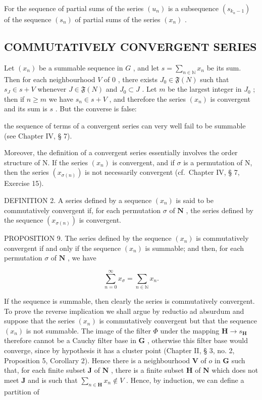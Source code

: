 For the sequence of partial sums of the series \((u_{n})\) is a subsequence \((s_{k_{n}-1})\) of the sequence \((s_{n})\) of partial sums of the series \((x_{n})\) .

\subsection{COMMUTATIVELY CONVERGENT SERIES}

Let \((x_{n})\) be a summable sequence in \(G\) , and let \(s = \sum_{n\in \mathbb{N}}x_n\) be its sum. Then for each neighbourhood \(V\) of \(0\) , there exists \(J_0\in \mathfrak{F}(N)\) such that \(s_J\in s + V\) whenever \(J\in \mathfrak{F}(N)\) and \(J_0\subset J\) . Let \(m\) be the largest integer in \(J_0\) ; then if \(n\geqslant m\) we have \(s_n\in s + V\) , and therefore the series \((x_{n})\) is convergent and its sum is \(s\) . But the converse is false:

the sequence of terms of a convergent series can very well fail to be summable (see Chapter IV, § 7).

Moreover, the definition of a convergent series essentially involves the order structure of N. If the series \((x_{n})\) is convergent, and if \(\sigma\) is a permutation of N, then the series \((x_{\sigma(n)})\) is not necessarily convergent (cf.~Chapter IV, § 7, Exercise 15).

DEFINITION 2. A series defined by a sequence \((x_{n})\) is said to be commutatively convergent if, for each permutation \(\sigma\) of \(\mathbf{N}\) , the series defined by the sequence \((x_{\sigma(n)})\) is convergent.

PROPOSITION 9. The series defined by the sequence \((x_{n})\) is commutatively convergent if and only if the sequence \((x_{n})\) is summable; and then, for each permutation \(\sigma\) of \(\mathbf{N}\) , we have

\[
\sum_ {n = 0} ^ {\infty} x _ {\sigma} = \sum_ {n \in \mathbb {N}} x _ {n}.
\]

If the sequence is summable, then clearly the series is commutatively convergent. To prove the reverse implication we shall argue by reductio ad absurdum and suppose that the series \((x_{n})\) is commutatively convergent but that the sequence \((x_{n})\) is not summable. The image of the filter \(\Phi\) under the mapping \(\mathbf{H} \to s_{\mathbf{H}}\) therefore cannot be a Cauchy filter base in \(\mathbf{G}\) , otherwise this filter base would converge, since by hypothesis it has a cluster point (Chapter II, § 3, no. 2, Proposition 5, Corollary 2). Hence there is a neighbourhood \(\mathbf{V}\) of \(o\) in \(\mathbf{G}\) such that, for each finite subset \(\mathbf{J}\) of \(\mathbf{N}\) , there is a finite subset \(\mathbf{H}\) of \(\mathbf{N}\) which does not meet \(\mathbf{J}\) and is such that \(\sum_{n \in \mathbf{H}} x_{n} \notin V\) . Hence, by induction, we can define a partition of

